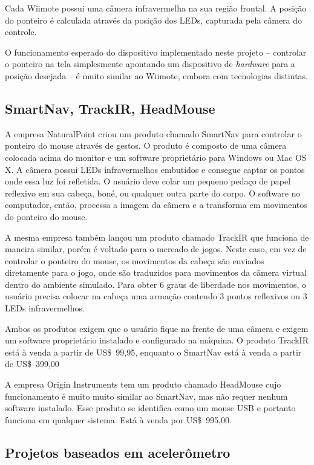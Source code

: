 \documentclass[brazil,pagestart=firstchapter]{abnt}
\begin{document}
Cada Wiimote possui uma câmera infravermelha na sua região frontal. A
posição do ponteiro é calculada através da posição dos \acsp{LED}, capturada
pela câmera do controle.

O funcionamento esperado do dispositivo implementado neste projeto --
controlar o ponteiro na tela simplesmente apontando um dispositivo de
\textit{hardware} para a posição desejada -- é muito similar ao Wiimote,
embora com tecnologias distintas.


\subsection{SmartNav, TrackIR, HeadMouse}
\label{sub:naturalpoint}

A empresa NaturalPoint criou um produto chamado SmartNav \cite{SmartNav}
para controlar o ponteiro do mouse através de gestos. O produto é composto
de uma câmera colocada acima do monitor e um software proprietário para
Windows ou Mac OS X. A câmera possui \acsp{LED} infravermelhos embutidos e
consegue captar os pontos onde essa luz foi refletida. O usuário deve colar
um pequeno pedaço de papel reflexivo em sua cabeça, boné, ou qualquer outra
parte do corpo. O software no computador, então, processa a imagem da câmera
e a transforma em movimentos do ponteiro do mouse.

A mesma empresa também lançou um produto chamado TrackIR \cite{TrackIR} que
funciona de maneira similar, porém é voltado para o mercado de jogos. Neste
caso, em vez de controlar o ponteiro do mouse, os movimentos da cabeça são
enviados diretamente para o jogo, onde são traduzidos para movimentos da
câmera virtual dentro do ambiente simulado. Para obter 6 graus de liberdade
nos movimentos, o usuário precisa colocar na cabeça uma armação contendo 3
pontos reflexivos ou 3 \acsp{LED} infravermelhos.

Ambos os produtos exigem que o usuário fique na frente de uma câmera e
exigem um software proprietário instalado e configurado na máquina. O
produto TrackIR está à venda a partir de US\$~99,95, enquanto o SmartNav
está à venda a partir de US\$~399,00

A empresa Origin Instruments tem um produto chamado HeadMouse
\cite{HeadMouse} cujo funcionamento é muito muito similar ao SmartNav, mas
não requer nenhum software instalado. Esse produto se identifica como um
mouse \acs{USB} e portanto funciona em qualquer sistema. Está à venda por
US\$~995,00.


\subsection{Projetos baseados em acelerômetro}
\label{sub:acelerometro}
\end{document}
